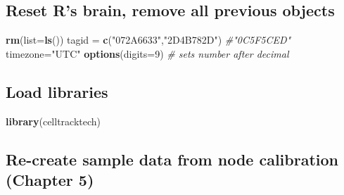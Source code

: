 \documentclass[
]{book}
\newenvironment{Shaded}{\begin{snugshade}}{\end{snugshade}}
\newcommand{\AttributeTok}[1]{\textcolor[rgb]{0.13,0.29,0.53}{#1}}
\newcommand{\CommentTok}[1]{\textcolor[rgb]{0.56,0.35,0.01}{\textit{#1}}}
\newcommand{\DecValTok}[1]{\textcolor[rgb]{0.00,0.00,0.81}{#1}}
\newcommand{\FunctionTok}[1]{\textcolor[rgb]{0.13,0.29,0.53}{\textbf{#1}}}
\newcommand{\NormalTok}[1]{#1}
\newcommand{\OtherTok}[1]{\textcolor[rgb]{0.56,0.35,0.01}{#1}}
\newcommand{\StringTok}[1]{\textcolor[rgb]{0.31,0.60,0.02}{#1}}
\begin{document}
\subsection{Reset R's brain, remove all previous objects}\label{reset-rs-brain-remove-all-previous-objects}

\begin{Shaded}
\begin{Highlighting}[]
\FunctionTok{rm}\NormalTok{(}\AttributeTok{list=}\FunctionTok{ls}\NormalTok{())}
\NormalTok{tagid }\OtherTok{=} \FunctionTok{c}\NormalTok{(}\StringTok{"072A6633"}\NormalTok{,}\StringTok{"2D4B782D"}\NormalTok{) }\CommentTok{\#"0C5F5CED"}
\NormalTok{timezone}\OtherTok{=}\StringTok{"UTC"}
\FunctionTok{options}\NormalTok{(}\AttributeTok{digits=}\DecValTok{9}\NormalTok{) }\CommentTok{\# sets number after decimal}
\end{Highlighting}
\end{Shaded}

\subsection{Load libraries}\label{load-libraries-1}

\begin{Shaded}
\begin{Highlighting}[]
\FunctionTok{library}\NormalTok{(celltracktech)}
\end{Highlighting}
\end{Shaded}

\subsection{Re-create sample data from node calibration (Chapter 5)}\label{re-create-sample-data-from-node-calibration-chapter-5}
\end{document}
